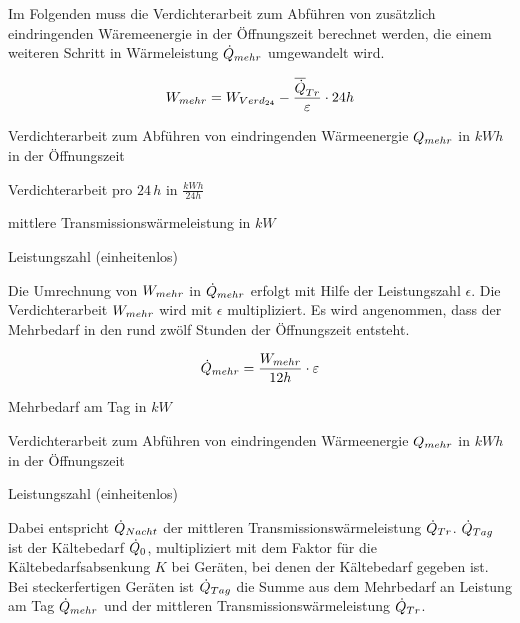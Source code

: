 Im Folgenden muss die Verdichterarbeit zum Abf\"uhren von zus\"atzlich
eindringenden W\"aremeenergie in der \"Offnungszeit berechnet werden, die einem
weiteren Schritt in W\"armeleistung $\pmehr$ umgewandelt wird.

\begin{equation}
	\lmehr = \lverd - \frac{\aptrans}{\epsilon} \cdot 24h
\label{lmehr}
\end{equation}

\begin{description}[\dth]

	\item[$\lmehr$] Verdichterarbeit zum Abführen von eindringenden
		Wärmeenergie $Q_{mehr}$ in $kWh$ in der \"Offnungszeit
	\item[$\lverd$] Verdichterarbeit pro $24\,h$ in $\frac{kWh}{24h}$
	\item[$\aptrans$] mittlere Transmissionswärmeleistung in $kW$
	\item[$\epsilon$] Leistungszahl (einheitenlos)

\end{description}
\vspace{0.5cm}

Die Umrechnung von $\lmehr$ in $\pmehr$ erfolgt mit Hilfe der Leistungszahl
$\epsilon$. Die Verdichterarbeit $\lmehr$ wird mit $\epsilon$ multipliziert.
Es wird angenommen, dass der Mehrbedarf in den rund zw\"olf Stunden der
\"Offnungszeit entsteht.

\begin{equation}
	\pmehr = \frac{\lmehr}{12h} \cdot \epsilon
\label{spmehr}
\end{equation}

\begin{description}[\dth]

	\item[$\pmehr$] Mehrbedarf am Tag in $kW$
	\item[$\lmehr$] Verdichterarbeit zum Abführen von eindringenden
		Wärmeenergie $Q_{mehr}$ in $kWh$ in der \"Offnungszeit
	\item[$\epsilon$] Leistungszahl (einheitenlos)

\end{description}
\vspace{0.5cm}

Dabei entspricht $\dot{Q}_{Nacht}$ der mittleren Transmissionswärmeleistung
$\dot{Q}_{Tr}$.
$\dot{Q}_{Tag}$ ist der Kältebedarf $\dot{Q}_{0}$, multipliziert mit dem Faktor für die
Kältebedarfsabsenkung $K$ bei Geräten, bei denen der Kältebedarf gegeben ist.
Bei steckerfertigen Geräten ist $\dot{Q}_{Tag}$ die Summe aus dem Mehrbedarf an Leistung
am Tag $\pmehr$ und der mittleren Transmissionswärmeleistung $\dot{Q}_{Tr}$.

